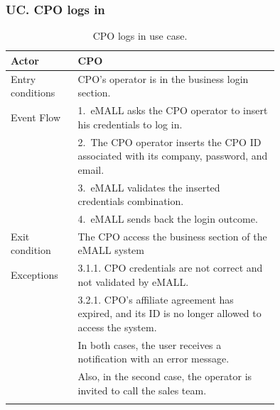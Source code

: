 \subsubsection*{UC\cuc . CPO logs in}
\begin{center}
    \begin{longtable}{lp{0.75\linewidth}}
        \hline
        Actor            & CPO                                                                                                 \\
        \hline
        Entry conditions & CPO’s operator is in the business login section.                                                    \\
        \hline
        Event Flow       & 1.\ eMALL asks the CPO operator to insert his credentials to log in.                                \\
        & 2.\ The CPO operator inserts the CPO ID associated with its company, password, and email.           \\
        & 3.\ eMALL validates the inserted credentials combination.                                           \\
        & 4.\ eMALL sends back the login outcome.                                                             \\
        \hline
        Exit condition   & The CPO access the business section of the eMALL system                                             \\
        \hline
        Exceptions       & 3.1.1. CPO credentials are not correct and not validated by eMALL.                                  \\
        & 3.2.1. CPO’s affiliate agreement has expired, and its ID is no longer allowed to access the system. \\
        & In both cases, the user receives a notification with an error message.                              \\
        & Also, in the second case, the operator is invited to call the sales team.                           \\
        \hline
        \caption{CPO logs in use case.}
        \label{tab: CPO_logs_in_use_case}
    \end{longtable}

\end{center}

